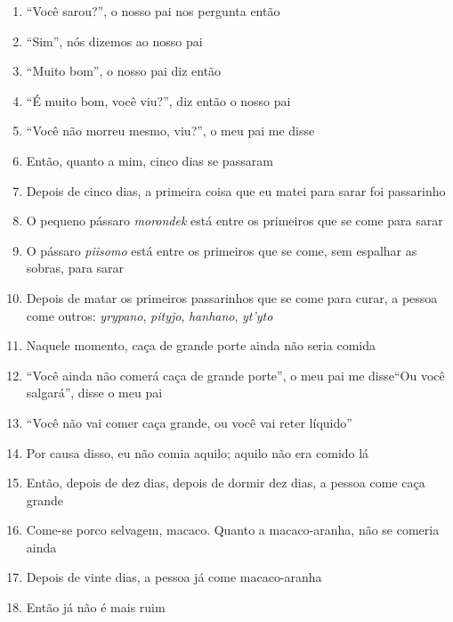 \begin{enumerate}
 \begin{center}\end{center}
 
 \item ``Você sarou?'', o nosso pai nos pergunta então
 \item ``Sim'', nós dizemos ao nosso pai
 \item ``Muito bom'', o nosso pai diz então
 \item ``É muito bom, você viu?'', diz então o nosso pai
 \item ``Você não morreu mesmo, viu?'', o meu pai me disse
 
 \begin{center}\end{center}
 
 \item Então, quanto a mim, cinco dias se passaram
 \item Depois de cinco dias, a primeira coisa que eu matei para sarar foi
 passarinho
 \item O pequeno pássaro \textit{morondek} está entre os primeiros que se come
 para sarar
 \item O pássaro \textit{piisomo} está entre os primeiros que se come, sem
 espalhar as sobras, para sarar
 \item Depois de matar os primeiros passarinhos que se come para curar, a
 pessoa come outros: \textit{yrypano}, \textit{pityjo}, \textit{hanhano},
 \textit{yt'yto}
 
 \begin{center}\end{center}
 
 \item Naquele momento, caça de grande porte ainda não seria comida
 \item ``Você ainda não comerá caça de grande porte'', o meu pai me
 disse``Ou você salgará'', disse o meu pai
 \item ``Você não vai comer caça grande, ou você vai reter líquido''
 \item Por causa disso, eu não comia aquilo; aquilo não era comido lá
 \item Então, depois de dez dias, depois de dormir dez dias, a pessoa come
 caça grande
 \item Come-se porco selvagem, macaco. Quanto a macaco-aranha, não se comeria ainda
 \item Depois de vinte dias, a pessoa já come macaco-aranha
 \item Então já não é mais ruim
 

\end{enumerate}
